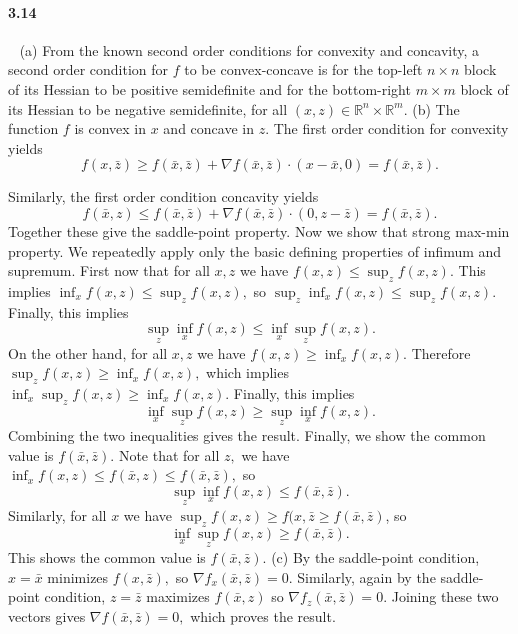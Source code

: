 \documentclass[a4paper,12pt]{article}
\begin{document}
\paragraph*{3.14}
\
\newline
(a) From the known second order conditions for convexity and concavity, a second order condition for $f$ to be convex-concave is for the top-left $n\times n$ block of its Hessian to be positive semidefinite and for the bottom-right $m\times m$ block of its Hessian to be negative semidefinite, for all $(x,z)\in\mathbb{R}^n\times \mathbb{R}^m.$
\newline
(b) The function $f$ is convex in $x$ and concave in $z.$ The first order condition for convexity yields $$ f(x, \bar{z}) \geq f(\bar{x},\bar{z}) + \nabla f(\bar{x}, \bar{z}) \cdot (x-\bar{x}, 0) = f(\bar{x},\bar{z}).$$

Similarly, the first order condition concavity yields 
$$ f(\bar{x}, z) \leq f(\bar{x}, \bar{z}) + \nabla f(\bar{x}, \bar{z}) \cdot (0, z-\bar{z}) = f(\bar{x}, \bar{z}).$$ Together these give the saddle-point property. 
\newline
Now we show that strong max-min property. We repeatedly apply only the basic defining properties of infimum and supremum. First now that for all $x,z$ we have $f(x,z) \leq \sup_z f(x,z).$ This implies $\inf_x f(x,z) \leq \sup_z f(x,z),$ so $\sup_z \inf_x f(x,z) \leq \sup_z f(x,z).$ Finally, this implies $$ \sup_z \inf_x f(x,z) \leq \inf_x \sup_z f(x,z).$$
\newline
On the other hand, for all $x,z$ we have $f(x,z) \geq \inf_x f(x,z).$ Therefore $\sup_z f(x,z) \geq \inf_x f(x,z),$ which implies $\inf_x \sup_z f(x,z) \geq \inf_x f(x,z).$ Finally, this implies 
$$ \inf_x \sup_z f(x,z) \geq \sup_z \inf_x f(x,z).$$
Combining the two inequalities gives the result. 
\newline
Finally, we show the common value is $f(\bar{x}, \bar{z}).$ Note that for all $z,$ we have $\inf_x f(x,z) \leq f(\bar{x}, z) \leq f(\bar{x}, \bar{z}),$ so 
$$ \sup_z \inf_x f(x,z) \leq f(\bar{x}, \bar{z}).$$
Similarly, for all $x$ we have $\sup_z f(x,z) \geq f(x,\bar{z}\geq f(\bar{x}, \bar{z})$, so
$$ \inf_x \sup_z f(x,z) \geq f(\bar{x}, \bar{z}).$$ This shows the common value is $f(\bar{x}, \bar{z}).$
\newline
(c) By the saddle-point condition, $x=\bar{x}$ minimizes $f(x,\bar{z}),$ so $\nabla f_x(\bar{x}, \bar{z}) =0.$ Similarly, again by the saddle-point condition, $z=\bar{z}$ maximizes $f(\bar{x}, z)$ so $\nabla f_z (\bar{x}, \bar{z}) =0.$ Joining these two vectors gives $\nabla f (\bar{x}, \bar{z}) = 0,$ which proves the result. 
\end{document}
